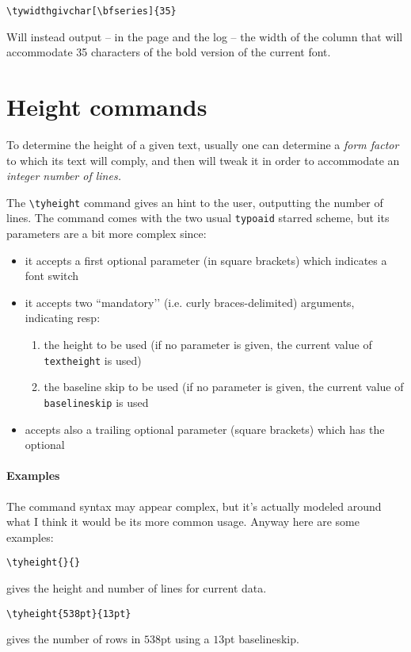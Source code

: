 \documentclass{article}
\makeatletter
\let\@@oldmpar\marginpar
\renewcommand{\marginpar}[1]{\@@oldmpar{\small#1}}
\makeatother
\begin{document}
\begin{verbatim}
\tywidthgivchar[\bfseries]{35}
\end{verbatim}
Will instead output -- in the page and the log -- the width of the column that will accommodate 35 characters of the bold version of the current font.

\section{Height commands}
To determine the height of a given text, usually \cite{bib:bringhurst} one can determine a \emph{form factor} to which its text will comply, and then will tweak it in order to accommodate an \emph{integer number of lines.}

The  \marginpar{\texttt{\textbackslash tyheight}} \verb!\tyheight! command gives an hint to the user, outputting the number of lines. The command comes with the two usual \texttt{typoaid} starred scheme, but its parameters are a bit more complex since:
\begin{itemize}
\item it accepts a first optional parameter (in square brackets) which indicates a font switch
\item it accepts two ``mandatory’’  (i.e. curly braces-delimited) arguments, indicating resp:
\begin{enumerate}
\item the height to be used (if no parameter is given, the current value of  \texttt{textheight} is used)
\item the baseline skip to be used (if no parameter is given, the current  value of \texttt{baselineskip} is used
\end{enumerate}
\item accepts also a trailing optional parameter (square brackets) which has the optional 
\end{itemize}

\paragraph{Examples} 
The command syntax may appear complex, but it’s actually modeled around what I think it would be its more common usage. Anyway here are some examples:
\begin{verbatim}
\tyheight{}{}
\end{verbatim}
gives the height and number of lines for current data.

\begin{verbatim}
\tyheight{538pt}{13pt}
\end{verbatim}
gives the number of rows in $538$pt using a $13$pt baselineskip.
\end{document}
